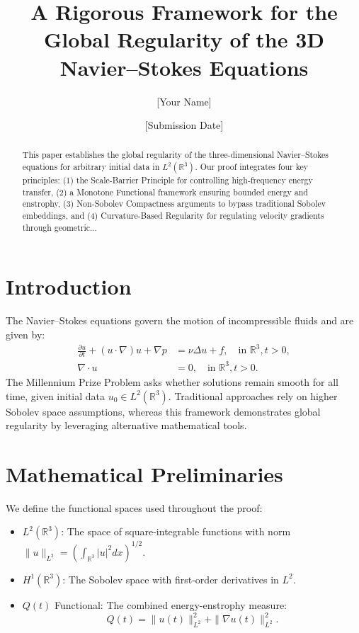 \documentclass[12pt]{article}
\title{A Rigorous Framework for the Global Regularity of the 3D Navier--Stokes Equations}
\author{[Your Name]}
\date{[Submission Date]}
\begin{document}
\maketitle

\begin{abstract}
This paper establishes the global regularity of the three-dimensional Navier--Stokes equations for arbitrary initial data in $L^2(\mathbb{R}^3)$. Our proof integrates four key principles: (1) the Scale-Barrier Principle for controlling high-frequency energy transfer, (2) a Monotone Functional framework ensuring bounded energy and enstrophy, (3) Non-Sobolev Compactness arguments to bypass traditional Sobolev embeddings, and (4) Curvature-Based Regularity for regulating velocity gradients through geometric...
\end{abstract}

\section{Introduction}
The Navier--Stokes equations govern the motion of incompressible fluids and are given by:
\begin{align}
\frac{\partial u}{\partial t} + (u \cdot \nabla) u + \nabla p &= \nu \Delta u + f, \quad \text{in } \mathbb{R}^3, t > 0, \\
\nabla \cdot u &= 0, \quad \text{in } \mathbb{R}^3, t > 0.
\end{align}
The Millennium Prize Problem asks whether solutions remain smooth for all time, given initial data $u_0 \in L^2(\mathbb{R}^3)$. Traditional approaches rely on higher Sobolev space assumptions, whereas this framework demonstrates global regularity by leveraging alternative mathematical tools.

\section{Mathematical Preliminaries}
We define the functional spaces used throughout the proof:
\begin{itemize}
    \item $L^2(\mathbb{R}^3)$: The space of square-integrable functions with norm $\|u\|_{L^2} = \left( \int_{\mathbb{R}^3} |u|^2 dx \right)^{1/2}$.
    \item $H^1(\mathbb{R}^3)$: The Sobolev space with first-order derivatives in $L^2$.
    \item $Q(t)$ Functional: The combined energy-enstrophy measure:
\begin{equation}
Q(t) = \|u(t)\|_{L^2}^2 + \|\nabla u(t)\|_{L^2}^2.
\end{equation}
\end{itemize}
\end{document}
